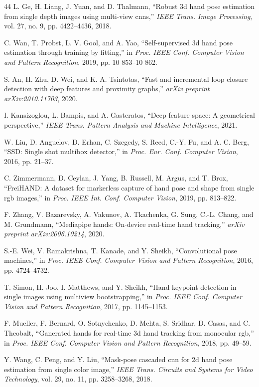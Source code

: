 \documentclass[11pt]{article}
\begin{document}
\begin{thebibliography}{44}
L. Ge, H. Liang, J. Yuan, and D. Thalmann, ``Robust 3d hand pose estimation from single depth images using multi-view cnns,'' \emph{IEEE Trans. Image Processing}, vol. 27, no. 9, pp. 4422--4436, 2018.

C. Wan, T. Probst, L. V. Gool, and A. Yao, ``Self-supervised 3d hand pose estimation through training by fitting,'' in \emph{Proc. IEEE Conf. Computer Vision and Pattern Recognition}, 2019, pp. 10 853--10 862.

S. An, H. Zhu, D. Wei, and K. A. Tsintotas, ``Fast and incremental loop closure detection with deep features and proximity graphs,'' \emph{arXiv preprint arXiv:2010.11703}, 2020.

I. Kansizoglou, L. Bampis, and A. Gasteratos, ``Deep feature space: A geometrical perspective,'' \emph{IEEE Trans. Pattern Analysis and Machine Intelligence}, 2021.

W. Liu, D. Anguelov, D. Erhan, C. Szegedy, S. Reed, C.-Y. Fu, and A. C. Berg, ``SSD: Single shot multibox detector,'' in \emph{Proc. Eur. Conf. Computer Vision}, 2016, pp. 21--37.

C. Zimmermann, D. Ceylan, J. Yang, B. Russell, M. Argus, and T. Brox, ``FreiHAND: A dataset for markerless capture of hand pose and shape from single rgb images,'' in \emph{Proc. IEEE Int. Conf. Computer Vision}, 2019, pp. 813--822.

F. Zhang, V. Bazarevsky, A. Vakunov, A. Tkachenka, G. Sung, C.-L. Chang, and M. Grundmann, ``Mediapipe hands: On-device real-time hand tracking,'' \emph{arXiv preprint arXiv:2006.10214}, 2020.

S.-E. Wei, V. Ramakrishna, T. Kanade, and Y. Sheikh, ``Convolutional pose machines,'' in \emph{Proc. IEEE Conf. Computer Vision and Pattern Recognition}, 2016, pp. 4724--4732.

T. Simon, H. Joo, I. Matthews, and Y. Sheikh, ``Hand keypoint detection in single images using multiview bootstrapping,'' in \emph{Proc. IEEE Conf. Computer Vision and Pattern Recognition}, 2017, pp. 1145--1153.

F. Mueller, F. Bernard, O. Sotnychenko, D. Mehta, S. Sridhar, D. Casas, and C. Theobalt, ``Ganerated hands for real-time 3d hand tracking from monocular rgb,'' in \emph{Proc. IEEE Conf. Computer Vision and Pattern Recognition}, 2018, pp. 49--59.

Y. Wang, C. Peng, and Y. Liu, ``Mask-pose cascaded cnn for 2d hand pose estimation from single color image,'' \emph{IEEE Trans. Circuits and Systems for Video Technology}, vol. 29, no. 11, pp. 3258--3268, 2018.


\end{thebibliography}
\end{document}
